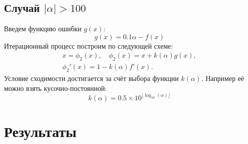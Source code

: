\documentclass[a4paper,12pt]{article}
\begin{document}
\subsection*{Случай \(\vert\alpha\vert > 100\)}
Введем функцию ошибки \(g(x)\):
\begin{equation}
  g(x)=0.1\alpha - f(x)
\end{equation}
Итерационный процесс построим по следующей схеме:
\begin{gather}
  x = \phi_2(x), \quad \phi_2(x)=x + k(\alpha)g(x),\\
  \phi_2'(x) = 1 - k(\alpha) f'(x).
\end{gather}
Условие сходимости достигается за счёт выбора функции \(k(\alpha)\). Например её можно взять кусочно-постоянной:
\begin{equation}
  k(\alpha) = 0.5\times 10^{\lfloor \log_{10}(\alpha)\rfloor}
\end{equation}

\section*{Результаты}

\end{document}
